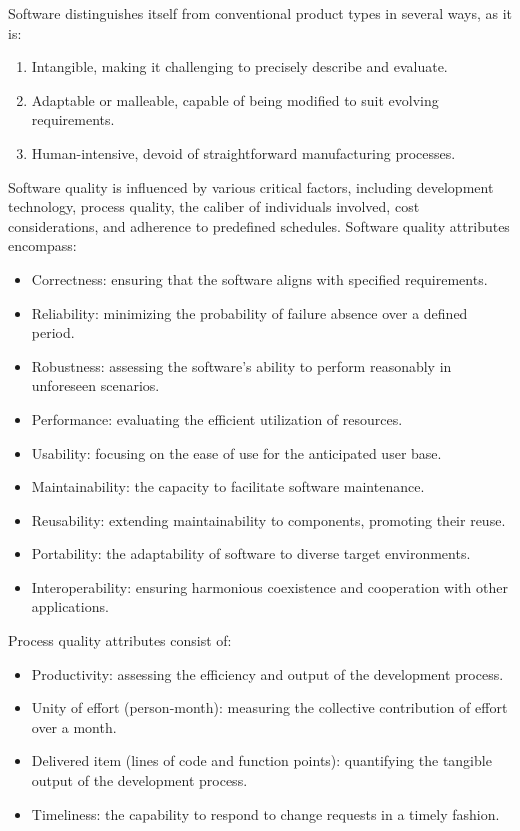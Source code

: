 \documentclass[12pt, a4paper]{report}
\begin{document}
    Software distinguishes itself from conventional product types in several ways, as it is:
    \begin{enumerate}
        \item Intangible, making it challenging to precisely describe and evaluate.
        \item Adaptable or malleable, capable of being modified to suit evolving requirements.
        \item Human-intensive, devoid of straightforward manufacturing processes.
    \end{enumerate}
    Software quality is influenced by various critical factors, including development technology, process quality, the caliber of individuals involved, cost considerations, and adherence to predefined schedules. 
    Software quality attributes encompass:
    \begin{itemize}
        \item Correctness: ensuring that the software aligns with specified requirements.
        \item Reliability: minimizing the probability of failure absence over a defined period.
        \item Robustness: assessing the software's ability to perform reasonably in unforeseen scenarios.
        \item Performance: evaluating the efficient utilization of resources.
        \item Usability: focusing on the ease of use for the anticipated user base.
        \item Maintainability: the capacity to facilitate software maintenance.
        \item Reusability: extending maintainability to components, promoting their reuse.
        \item Portability: the adaptability of software to diverse target environments.
        \item Interoperability: ensuring harmonious coexistence and cooperation with other applications.
    \end{itemize}
    Process quality attributes consist of:
    \begin{itemize}
        \item Productivity: assessing the efficiency and output of the development process.
        \item Unity of effort (person-month): measuring the collective contribution of effort over a month.
        \item Delivered item (lines of code and function points): quantifying the tangible output of the development process.
        \item Timeliness: the capability to respond to change requests in a timely fashion.
    \end{itemize}
\end{document}
